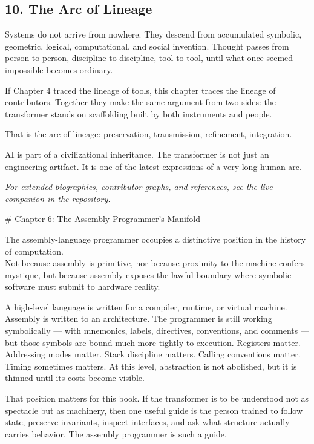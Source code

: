 \documentclass[
]{article}
\begin{document}
\hypertarget{the-arc-of-lineage}{%
\subsection{10. The Arc of Lineage}\label{the-arc-of-lineage}}

Systems do not arrive from nowhere. They descend from accumulated
symbolic, geometric, logical, computational, and social invention.
Thought passes from person to person, discipline to discipline, tool to
tool, until what once seemed impossible becomes ordinary.

If Chapter 4 traced the lineage of tools, this chapter traces the
lineage of contributors. Together they make the same argument from two
sides: the transformer stands on scaffolding built by both instruments
and people.

That is the arc of lineage: preservation, transmission, refinement,
integration.

AI is part of a civilizational inheritance. The transformer is not just
an engineering artifact. It is one of the latest expressions of a very
long human arc.

\emph{For extended biographies, contributor graphs, and references, see
the live companion in the repository.}

\newpage
\vspace*{3cm}
\begin{center}
# Chapter 6: The Assembly Programmer’s Manifold
\end{center}

The assembly-language programmer occupies a distinctive position in the
history of computation.\\
Not because assembly is primitive, nor because proximity to the machine
confers mystique, but because assembly exposes the lawful boundary where
symbolic software must submit to hardware reality.

A high-level language is written for a compiler, runtime, or virtual
machine. Assembly is written to an architecture. The programmer is still
working symbolically --- with mnemonics, labels, directives,
conventions, and comments --- but those symbols are bound much more
tightly to execution. Registers matter. Addressing modes matter. Stack
discipline matters. Calling conventions matter. Timing sometimes
matters. At this level, abstraction is not abolished, but it is thinned
until its costs become visible.

That position matters for this book. If the transformer is to be
understood not as spectacle but as machinery, then one useful guide is
the person trained to follow state, preserve invariants, inspect
interfaces, and ask what structure actually carries behavior. The
assembly programmer is such a guide.
\end{document}
